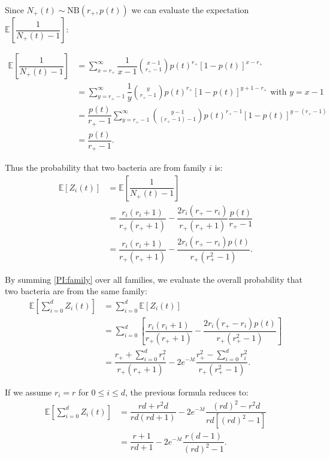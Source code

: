 \documentclass{article}
\begin{document}
Since $N_+(t) \sim \mathrm{NB} (r_+, p(t))$ we can evaluate the expectation $\mathbb{E}\left[\dfrac{1}{N_+(t)-1} \right]$:

\begin{align}
\mathbb{E}\left[\dfrac{1}{N_+(t)-1} \right] &= \sum_{x=r_+}^{\infty } \dfrac{1}{x-1} \binom{x-1}{r_+-1} p(t)^{r_+} [1-p(t)]^{x-r_+} \\
 &=\sum_{y=r_+-1}^{\infty} \dfrac{1}{y} \binom{y}{r_+-1} p(t)^{r_+} [1-p(t)]^{y+1-r_+} \text{ with }y=x-1\\
 &=\dfrac{p(t)}{r_+-1}\sum_{y=r_+-1}^{\infty}\binom{y-1}{(r_+-1)-1} p(t)^{r_+-1} [1-p(t)]^{y-(r_+-1)} \\
 &=\dfrac{p(t)}{r_+-1}.
\end{align}

Thus the probability that two bacteria are from family $i$ is:
\begin{align}
\mathbb{E}\left[ Z_i(t) \right] &= \mathbb{E}\left[\dfrac{1}{N_+(t)-1} \right]\\
 &=\dfrac{r_i(r_i+1)}{r_+ (r_+ +1 )}-\dfrac{2 r_i (r_+ -r_{i})}{r_+ (r_+ +1 )}\dfrac{p(t)}{r_+-1}\\
 &=\dfrac{r_i(r_i+1)}{r_+ (r_+ +1 )}-\dfrac{2 r_i (r_+ -r_{i})p(t)}{r_+ (r_+^2 -1 )}. \label{PI:family}
\end{align}


By summing \eqref{PI:family} over all families, we evaluate the overall probability that two bacteria are from the same family:
\begin{align}
\mathbb{E}\left[ \displaystyle \sum_{i=0}^d Z_i(t) \right] &= \displaystyle \sum_{i=0}^d \mathbb{E}\left[ Z_i(t) \right]\\
&= \displaystyle \sum_{i=0}^d \left[ \dfrac{r_i(r_i+1)}{r_+ (r_+ +1 )}-\dfrac{2 r_i (r_+ -r_{i})p(t)}{r_+ (r_+^2 -1 )} \right] \\
&=    \dfrac{ r_+ + \sum_{i=0}^d r_i^2}{r_+ (r_+ +1)}  -2 e^{-\lambda t} \dfrac{ r_+^2-\sum_{i=0}^d r_i^2}{r_+ (r_+^2 -1) }. \label{PI}
\end{align}

If we assume $r_i=r$ for $0 \leq i \leq d$, the previous formula reduces to:
\begin{align}
\mathbb{E}\left[ \displaystyle \sum_{i=0}^d Z_i(t) \right] &=
 \dfrac{ rd + r^2 d}{rd (rd +1)}  -2 e^{-\lambda t} \dfrac{ (rd)^2-r^2d}{rd [(rd)^2 -1] }\\
 &= \dfrac{r+1}{rd+1}  -2e^{-\lambda t} \dfrac{r(d-1)}{(rd)^2 -1 }.
\end{align}
\end{document}

